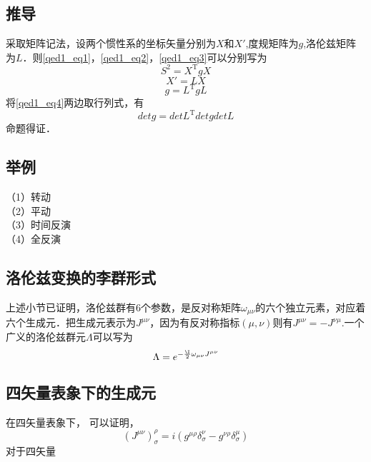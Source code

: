 \subsection{推导}
采取矩阵记法，设两个惯性系的坐标矢量分别为$X$和$X'$,度规矩阵为$g$,洛伦兹矩阵为$L$．则\autoref{qed1_eq1}，\autoref{qed1_eq2}，\autoref{qed1_eq3}可以分别写为
\begin{equation}
S^{2}=X^{\mathrm{T}} g X
\end{equation}
\begin{equation}
X'=LX
\end{equation}
\begin{equation}\label{qed1_eq4}
g=L^{\mathrm{T}} g L
\end{equation}
将\autoref{qed1_eq4}两边取行列式，有
\begin{equation}
detg=detL^{\mathrm{T}} detg detL
\end{equation}
命题得证．
\subsection{举例}
（1）转动\\
（2）平动\\
（3）时间反演\\
（4）全反演\\
\subsection{洛伦兹变换的李群形式}
上述小节已证明，洛伦兹群有6个参数，是反对称矩阵$\omega_{\mu\nu}$的六个独立元素，对应着六个生成元．把生成元表示为$J^{\mu\nu}$，因为有反对称指标$(\mu,\nu)$则有$J^{\mu\nu}=-J^{\nu\mu}$.一个广义的洛伦兹群元$\Lambda$可以写为
\begin{equation}
\Lambda=e^{-\frac{\I}{2} \omega_{\mu\nu}J^{\mu\nu}}
\end{equation}
\subsection{四矢量表象下的生成元}
在四矢量表象下，
可以证明，
\begin{equation}\left(J^{\mu \nu}\right)_{\sigma}^{\rho}=i\left(g^{\mu \rho} \delta_{\sigma}^{\nu}-g^{\nu \rho} \delta_{\sigma}^{\mu}\right)\end{equation}
对于四矢量
